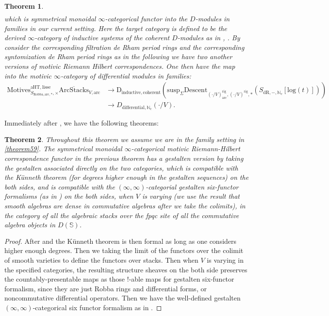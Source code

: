 \documentclass[12pt]{article}
\newtheorem{theorem}{Theorem}
\theoremstyle{definition}
\begin{document}
\begin{theorem}
\begin{align}
\end{align}
which is symmetrical monoidal $\infty$-categorical functor into the $D$-modules in families in our current setting. Here the target category is defined to be the derived $\infty$-category of inductive systems of the coherent $D$-modules as in \cite{5GR1}, \cite{5GR2}. By consider the corresponding filtration de Rham period rings and the corresponding syntomization de Rham period rings as in the following we have two another versions of motivic Riemann Hilbert correspondences. One then have the map into the motivic $\infty$-category of differential modules in families:
\begin{align}
\mathrm{Motives}^{\mathrm{aHT},\mathrm{lisse}}_{S_{\mathrm{Robba},\mathrm{arc},*},\times}\overline{\mathrm{ArcStacks}}_{V,\mathrm{arc}}&\longrightarrow \mathrm{D}_{\mathrm{inductive},\mathrm{coherent}}(\mathrm{susp}_\Sigma\mathrm{Descent}_{(\cdot/V)^\mathrm{rig}_\mathrm{arc},(\cdot/V)^\mathrm{rig},*}(S_{\mathrm{dR},-,\mathbb{N}_c}[\mathrm{log}(t)]))\\
&\longrightarrow D_{\mathrm{differential},\mathbb{N}_c}(\cdot/V).
\end{align}
\end{theorem}

\indent Immediately after \cite{5S5}, \cite{5Ga} we have the following theorems:

\begin{theorem}
Throughout this theorem we assume we are in the family setting in \cref{theorem59}. The symmetrical monoidal $\infty$-categorical motivic Riemann-Hilbert correspondence functor in the previous theorem has a gestalten version by taking the gestalten associated directly on the two categories, which is compatible with the K\"unneth theorem (for degrees higher enough in the gestalten sequences) on the both sides, and is compatible with the $(\infty,\infty)$-categorial gestalten six-functor formalisms (as in \cite{5S5}) on the both sides, when $V$ is varying (we use the result that smooth algebras are dense in commutative algebras after we take the colimits), in the category of all the algebraic stacks over the fpqc site of all the commutative algebra objects in $D(\mathbb{S})$.
\end{theorem}

\begin{proof}
After \cite{5S5} and \cite{5Ga} the K\"unneth theorem is then formal as long as one considers higher enough degrees. Then we taking the limit of the functors over the colimit of smooth varieties to define the functors over stacks. Then when $V$ is varying in the specified categories, the resulting structure sheaves on the both side preserves the countably-presentable maps as those $!$-able maps for gestalten six-functor formalism, since they are just Robba rings and differential forms, or noncommutative differential operators. Then we have the well-defined gestalten $(\infty,\infty)$-categorical six functor formalism as in \cite{5S5}.
\end{proof}
\end{document}
